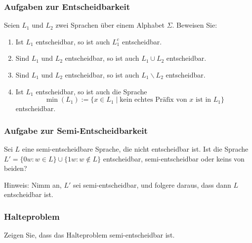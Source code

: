 \documentclass{beamer}
\begin{document}
{\begin{frame}
\frametitle{Aufgaben zur Entscheidbarkeit}
 Seien $L_1$ und $L_2$ zwei Sprachen über einem Alphabet $\Sigma$.
Beweisen Sie:
\begin{enumerate}
\item Ist $L_1$ entscheidbar, so ist auch $L_1^c$ entscheidbar.
\item Sind $L_1$ und $L_2$ entscheidbar, so ist auch $L_1\cup L_2$ entscheidbar.
\item Sind $L_1$ und $L_2$ entscheidbar, so ist auch $L_1\backslash L_2$ entscheidbar.
\item Ist $L_1$ entscheidbar, so ist auch die Sprache 
$$\min(L_1):=\{x\in L_1\mid \text{kein echtes Präfix von $x$ ist in }L_1 \}$$
entscheidbar.
\end{enumerate}
\end{frame}

\begin{frame}
 \frametitle{Aufgabe zur Semi-Entscheidbarkeit}
Sei $L$ eine semi-entscheidbare Sprache, die nicht entscheidbar ist. Ist die
Sprache $L'=\{0w:w \in L\} \cup \{1w: w \not\in L\}$ entscheidbar,
semi-entscheidbar oder keins von beiden?

Hinweis: Nimm an, $L'$ sei semi-entscheidbar, und folgere daraus, dass
dann $L$ entscheidbar ist. 
\end{frame}


\begin{frame}
 \frametitle{Halteproblem}
 Zeigen Sie, dass das Halteproblem semi-entscheidbar ist.
\end{frame}

}
\end{document}
